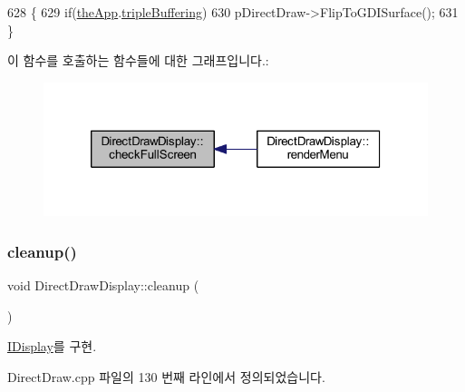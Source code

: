 \begin{DoxyCode}
628 \{
629   \textcolor{keywordflow}{if}(\mbox{\hyperlink{_v_b_a_8cpp_a8095a9d06b37a7efe3723f3218ad8fb3}{theApp}}.\mbox{\hyperlink{class_v_b_a_af597e2c2466efdc6365a5d725651b855}{tripleBuffering}})
630     pDirectDraw->FlipToGDISurface();
631 \}
\end{DoxyCode}
이 함수를 호출하는 함수들에 대한 그래프입니다.\+:
\nopagebreak
\begin{figure}[H]
\begin{center}
\leavevmode
\includegraphics[width=320pt]{class_direct_draw_display_ada4eacae559651471181ec781dce1716_icgraph}
\end{center}
\end{figure}
\mbox{\label{class_direct_draw_display_a9ef5e33d516c118742d7cf3b52ed28fc}} 
\subsubsection{\texorpdfstring{cleanup()}{cleanup()}}
{\footnotesize\ttfamily void Direct\+Draw\+Display\+::cleanup (\begin{DoxyParamCaption}{ }\end{DoxyParamCaption})\hspace{0.3cm}{\ttfamily [virtual]}}



\mbox{\hyperlink{class_i_display_a039e8c6b3f8fbee485fb895ef70e72c0}{I\+Display}}를 구현.



Direct\+Draw.\+cpp 파일의 130 번째 라인에서 정의되었습니다.


